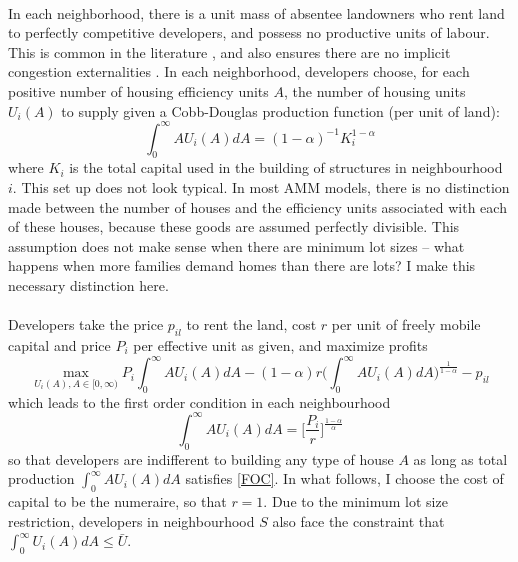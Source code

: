 \documentclass[]{article}
\theoremstyle{plain}
\begin{document}
\paragraph*{}
In each neighborhood, there is a unit mass of absentee landowners who rent land to perfectly competitive developers, and possess no productive units of labour. This is common in the literature \citep{hseihmoretti} \citep{Coutureetal}, and also ensures there are no implicit congestion externalities \citep{quantspatial}. In each neighborhood, developers choose, for each positive number of housing efficiency units $A$, the number of housing units $U_{i}(A)$ to supply given a Cobb-Douglas production function (per unit of land):
\begin{equation}
\int_{0}^{\infty}AU_{i}(A)dA = (1-\alpha)^{-1}K_{i}^{1-\alpha}
\end{equation}
where $K_{i}$ is the total capital used in the building of structures in neighbourhood $i$. This set up does not look typical. In most AMM models, there is no distinction made between the number of houses and the efficiency units associated with each of these houses, because these goods are assumed perfectly divisible. This assumption does not make sense when there are minimum lot sizes -- what happens when more families demand homes than there are lots? I make this necessary distinction here.
\paragraph*{} 
Developers take the price $p_{il}$ to rent the land, cost $r$ per unit of freely mobile capital and price $P_{i}$ per effective unit as given, and maximize profits 
\begin{equation}
\max_{U_{i}(A), A \in [0, \infty)}P_{i}\int^{\infty}_{0}AU_{i}(A)dA - (1-\alpha)r\bigg(\int_{0}^{\infty}AU_{i}(A)dA\bigg)^{\frac{1}{1-\alpha}} - p_{il}
\end{equation}
which leads to the first order condition in each neighbourhood
\begin{equation}\label{FOC}
	\int_{0}^{\infty}AU_{i}(A)dA = \bigg[\frac{P_{i}}{r}\bigg]^{\frac{1 - \alpha}{\alpha}}
\end{equation}
so that developers are indifferent to building any type of house $A$ as long as total production 	$\int_{0}^{\infty}AU_{i}(A)dA$ satisfies \eqref{FOC}. In what follows, I choose the cost of capital to be the numeraire, so that $r = 1$. Due to the minimum lot size restriction, developers in neighbourhood $S$ also face the constraint that $\int_{0}^{\infty}U_{i}(A)dA \leq \bar{U}$.
\end{document}
